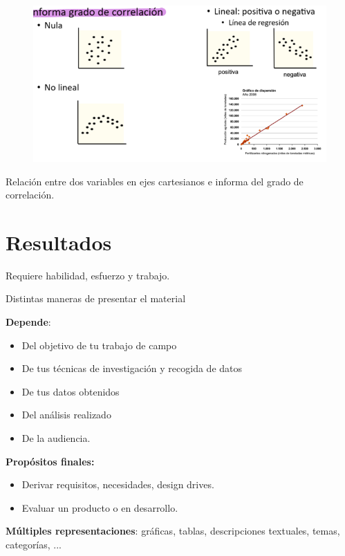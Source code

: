 \documentclass[12pt]{report} %
\begin{document}
\begin{figure}[H]
	{\includegraphics[scale=.4]{Untitled 10.png}}
\end{figure}

Relación entre dos variables en ejes cartesianos e informa del grado de
correlación.

\section{Resultados}

Requiere habilidad, esfuerzo y trabajo.

Distintas maneras de presentar el material

\textbf{Depende}:

\begin{itemize}
\item
  Del objetivo de tu trabajo de campo
\item
  De tus técnicas de investigación y recogida de datos
\item
  De tus datos obtenidos
\item
  Del análisis realizado
\item
  De la audiencia.
\end{itemize}

\textbf{Propósitos finales:}

\begin{itemize}
\item
  Derivar requisitos, necesidades, design drives.
\item
  Evaluar un producto o en desarrollo.
\end{itemize}

\textbf{Múltiples representaciones}: gráficas, tablas, descripciones textuales, temas, categorías, ...
\end{document}
